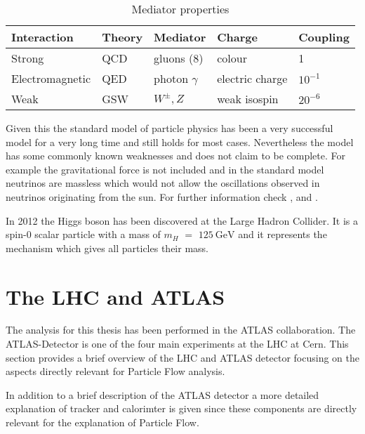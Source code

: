 \begin{table}[h]
\centering
\renewcommand{\arraystretch}{1.5}
\begin{tabular}{|l|l|l|l|l|}
\hline
Interaction     & Theory & Mediator        & Charge          & Coupling  \\ \hline
Strong          & QCD    & gluons (8)      & colour          & 1         \\ \hline
Electromagnetic & QED    & photon $\gamma$ & electric charge & $10^{-1}$ \\ \hline
Weak            & GSW    & $W^{\pm}, Z$    & weak isospin    & $20^{-6}$ \\ \hline
\end{tabular}
\caption{Mediator properties}
\label{mediator properties}
\end{table}

Given this the standard model of particle physics has been a very successful model for a very long time and still holds for most cases.
Nevertheless the model has some commonly known weaknesses and does not claim to be complete. For example the gravitational force is not included and in the standard model neutrinos are massless which would not allow the oscillations observed in neutrinos originating from the sun.
For further information check \cite{griffith08}, \cite{thomson13} and \cite{brock11}.

In 2012 the Higgs boson has been discovered at the Large Hadron Collider. It is a spin-0 scalar particle with a mass of $m_H$ $=$ $\SI{125}{\GeV}$ and it represents the mechanism which gives all particles their mass.

\newpage





\section{The LHC and ATLAS}

The analysis for this thesis has been performed in the ATLAS collaboration. The ATLAS-Detector is one of the four main experiments at the LHC at Cern. This section provides a brief overview of the LHC and ATLAS detector focusing on the aspects directly relevant for Particle Flow analysis.

In addition to a brief description of the ATLAS detector a more detailed explanation of tracker and calorimter is given since these components are directly relevant for the explanation of Particle Flow.

